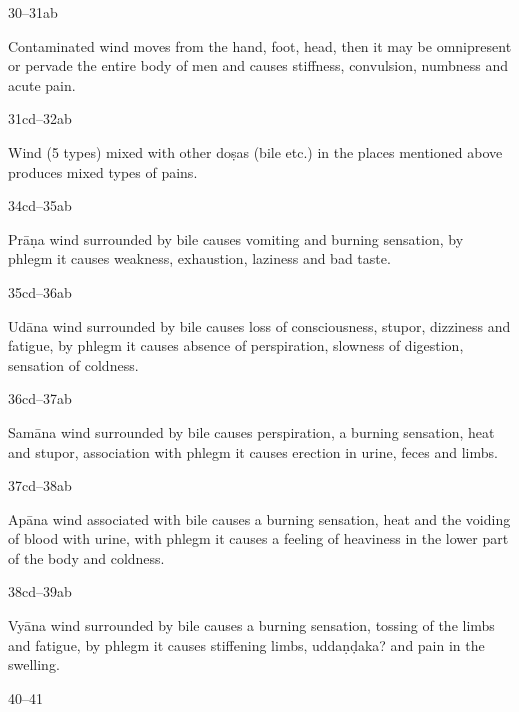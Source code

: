\begin{translation}
\item[30--31ab]

	Contaminated wind moves from the hand, foot, head, then it may be
	omnipresent or pervade the entire body of men and causes stiffness,
	convulsion, numbness and acute pain.

\item[31cd--32ab]

	Wind (5 types) mixed with other doṣas (bile etc.) in the places
	mentioned above produces mixed types of pains.

\item[34cd--35ab]

	Prāṇa wind surrounded by bile causes vomiting and burning sensation, by
	phlegm it causes weakness, exhaustion, laziness and bad taste. 

\item[35cd--36ab]

	Udāna wind surrounded by bile causes loss of consciousness, stupor,
	dizziness and fatigue, by phlegm it causes absence of perspiration,
	slowness of digestion, sensation of coldness.

\item[36cd--37ab]

	Samāna wind surrounded by bile causes perspiration, a burning sensation,
	heat and stupor, association with phlegm it causes erection in urine,
	feces and limbs.  

\item[37cd--38ab]

	Apāna wind associated with bile causes a burning sensation, heat and the
	voiding of blood with urine, with phlegm it causes a feeling of
	heaviness in the lower part of the body and coldness.

\item[38cd--39ab]

	Vyāna wind surrounded by bile causes a burning sensation, tossing of the
	limbs and fatigue, by phlegm it causes stiffening limbs, uddaṇḍaka? and
	pain in the swelling.

\item[40--41]


\end{translation}
